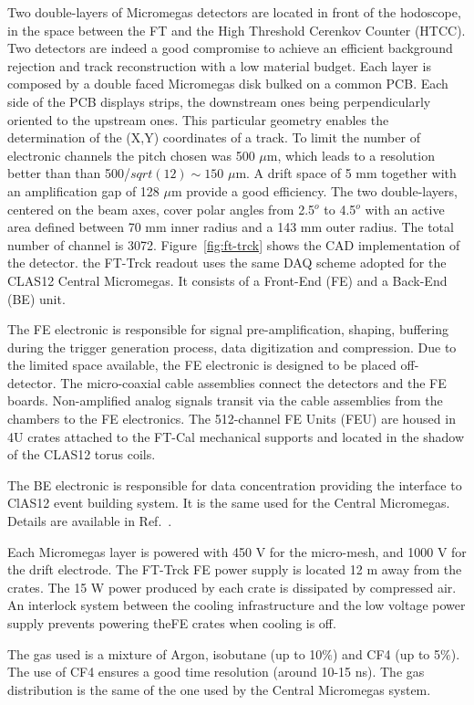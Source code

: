 Two double-layers of Micromegas detectors
are located in front of the hodoscope, in the space between the FT
and the High Threshold Cerenkov Counter
(HTCC). Two detectors are indeed a good compromise
to achieve an efficient background rejection
and track reconstruction with a low
material budget. Each layer is
composed by a double faced Micromegas disk
bulked on a common PCB. Each side of the
PCB displays strips, the downstream ones being
perpendicularly oriented to the upstream
ones. This particular geometry enables the
determination of the (X,Y) coordinates of a
track. To limit the number of electronic channels
the pitch chosen was 500 $\mu$m, which leads
to a resolution better than than 500/$sqrt(12)\sim 150$ $\mu$m.
A drift space of 5 mm together with an amplification gap of 128  $\mu$m provide
a good efficiency.
The two double-layers, centered on the beam axes,   cover polar angles from 2.5$^o$ to 4.5$^o$ with an active area defined
between 70 mm inner radius and a 143 mm outer radius.
The total number of channel is 3072.
Figure~\ref{fig:ft-trck} shows the CAD implementation of the detector. 
the FT-Trck readout uses the same DAQ scheme adopted for the CLAS12 Central Micromegas. It  consists
of a Front-End (FE) and a  Back-End (BE) unit. 

The FE
electronic is responsible for signal pre-amplification, shaping,  buffering during the trigger generation
process, data digitization and compression.
Due to the limited space available, the FE electronic 
is designed to be placed off-detector.
The micro-coaxial cable assemblies
connect the detectors and the FE boards. Non-amplified
analog signals transit via the cable
assemblies from the chambers to the FE electronics.
The 512-channel FE Units (FEU)
 are housed in 4U crates attached to the FT-Cal mechanical supports and  located
in the shadow of the CLAS12 torus coils.

The  BE electronic is
responsible for data concentration providing the 
interface to ClAS12
event building system. It is the same used for the Central Micromegas. Details are available in Ref.~\cite{mm}.

Each Micromegas layer  is powered with 
 450 V for the micro-mesh,
and 1000 V for the drift electrode.
The FT-Trck FE power supply is located 12 m away from the crates. The 15 W power produced by each crate is dissipated  by compressed air. An interlock system between the cooling
infrastructure and the low voltage power supply
prevents powering theFE crates
when cooling is off. 

The gas used 
is a mixture of Argon, isobutane (up to
10$\%$) and CF4 (up to 5$\%$). The use of
CF4 ensures a good time resolution (around
10-15 ns). The gas distribution is the same of the one used by the Central Micromegas system.


